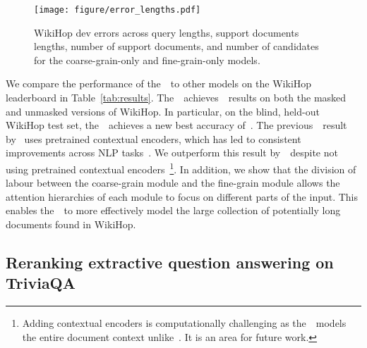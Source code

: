 \documentclass{article} \usepackage{iclr2019_conference,times}
\begin{document}
\begin{figure}
    \centering
    \texttt{[image: figure/error\_lengths.pdf]}
    \vspace{-0.3cm}
    \caption{WikiHop dev errors across query lengths, support documents lengths, number of support documents, and number of candidates for the coarse-grain-only and fine-grain-only models.}
    \label{fig:errorlengths}
    \vspace{-0.2cm}
\end{figure}






We compare the performance of the~\modelnameshort~to other models on the WikiHop leaderboard in Table~\ref{tab:results}.
The~\modelnameshort~achieves~\sota~results on both the masked and unmasked versions of WikiHop.
In particular, on the blind, held-out WikiHop test set, the~\modelnameshort~achieves a new best accuracy of~\testacc.
The previous~\sota~result by~\citet{cao2018question} uses pretrained contextual encoders, which has led to consistent improvements across NLP tasks~\citep{peters2018deep}.
We outperform this result by~\sotadiff~despite not using pretrained contextual encoders~\footnote{Adding contextual encoders is computationally challenging as the~\modelnameshort~models the entire document context unlike~\citep{cao2018question}. It is an area for future work.}.
In addition, we show that the division of labour between the coarse-grain module and the fine-grain module allows the attention hierarchies of each module to focus on different parts of the input.
This enables the~\modelnameshort~to more effectively model the large collection of potentially long documents found in WikiHop.



\subsection{Reranking extractive question answering on TriviaQA}
\end{document}
